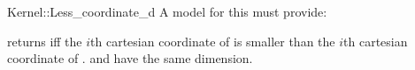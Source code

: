 \begin{ccRefFunctionObjectConcept}{Kernel::Less_coordinate_d}
A model for this must provide:


 {returns  iff  the $i$th cartesian coordinate
  of  is
  smaller than  the $i$th cartesian coordinate of .  \ccPrecond {} and  have
  the same dimension.}

\end{ccRefFunctionObjectConcept}
